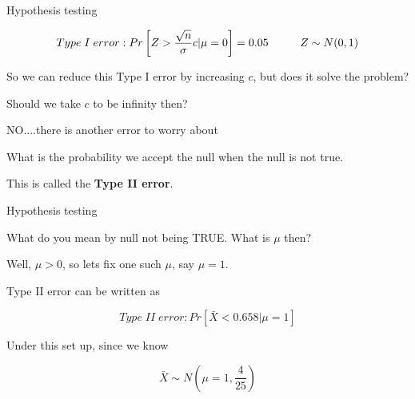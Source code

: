 \documentclass{beamer}\usepackage[]{graphicx}\usepackage[]{color}
\begin{document}
\begin{frame}{Hypothesis testing}

$$ Type \; I \; error: Pr \left [ Z > \frac{\sqrt{n}}{\sigma}c | \mu=0 \right ] = 0.05  \hspace{1 cm} Z \sim N(0,1) $$ \pause

So we can reduce this Type I error by increasing $c$, but does it solve the problem? \pause \newline

Should we take $c$ to be infinity then? \pause \newline

NO....there is another error to worry about  \pause \newline

What is the probability we accept the null when the null is not true. \pause \newline

This is called the \textbf{Type II error}.

\end{frame}

\begin{frame}{Hypothesis testing}

What do you mean by null not being TRUE. What is $\mu$ then? \pause \newline

Well, $\mu > 0$, so lets fix one such $\mu$, say $\mu=1$. \pause \newline

Type II error can be written as 

$$ Type \; II \; error:  Pr \left [ \bar{X} < 0.658 | \mu=1 \right] $$ \pause \newline

Under this set up, since we know 

$$ \bar{X} \sim N(\mu=1, \frac{4}{25}) $$

\end{frame}
\end{document}
